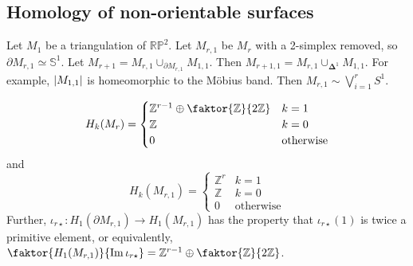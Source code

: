 \subsection{Homology of non-orientable surfaces}
Let \( M_1 \) be a triangulation of \( \mathbb R \mathbb P^2 \).
Let \( M_{r,1} \) be \( M_r \) with a 2-simplex removed, so \( \partial M_{r,1} \simeq \mathbb S^1 \).
Let \( M_{r+1} = M_{r,1} \cup_{\partial M_{r,1}} M_{1,1} \).
Then \( M_{r+1,1} = M_{r,1} \cup_{\bm\Delta^1} M_{1,1} \).
For example, \( \abs{M_{1,1}} \) is homeomorphic to the M\"obius band.
Then \( M_{r,1} \sim \bigvee_{i=1}^r S^1 \).
\begin{proposition}
	\[ H_k(M_r) = \begin{cases}
		\mathbb Z^{r-1} \oplus \faktor{\mathbb Z}{2\mathbb Z} & k = 1 \\
		\mathbb Z & k = 0 \\
		0 & \text{otherwise}
	\end{cases} \]
	and
	\[ H_k(M_{r,1}) = \begin{cases}
		\mathbb Z^r & k = 1 \\
		\mathbb Z & k = 0 \\
		0 & \text{otherwise}
	\end{cases} \]
	Further, \( \iota_{r\star} \colon H_1(\partial M_{r,1}) \to H_1(M_{r,1}) \) has the property that \( \iota_{r\star}(1) \) is twice a primitive element, or equivalently, \( \faktor{H_1(M_{r,1})}{\Im \iota_{r\star}} = \mathbb Z^{r-1} \oplus \faktor{\mathbb Z}{2\mathbb Z} \).
\end{proposition}
